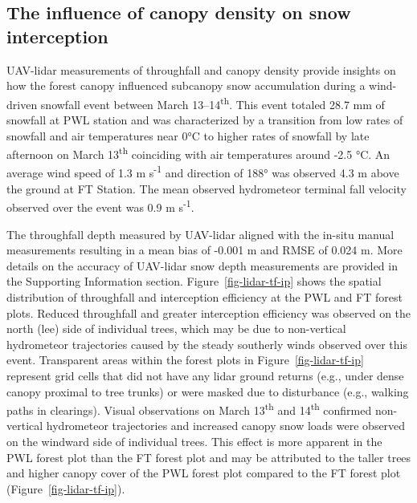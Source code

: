\documentclass[
  letterpaper,
  DIV=11,
  numbers=noendperiod]{scrartcl}
\begin{document}
\subsection{The influence of canopy density on snow
interception}\label{the-influence-of-canopy-density-on-snow-interception}

UAV-lidar measurements of throughfall and canopy density provide
insights on how the forest canopy influenced subcanopy snow accumulation
during a wind-driven snowfall event between March
13--14\textsuperscript{th}. This event totaled 28.7 mm of snowfall at
PWL station and was characterized by a transition from low rates of
snowfall and air temperatures near 0°C to higher rates of snowfall by
late afternoon on March 13\textsuperscript{th} coinciding with air
temperatures around -2.5 °C. An average wind speed of 1.3 m
s\textsuperscript{-1} and direction of 188° was observed 4.3 m above the
ground at FT Station. The mean observed hydrometeor terminal fall
velocity observed over the event was 0.9 m s\textsuperscript{-1}.

The throughfall depth measured by UAV-lidar aligned with the in-situ
manual measurements resulting in a mean bias of -0.001 m and RMSE of
0.024 m. More details on the accuracy of UAV-lidar snow depth
measurements are provided in the Supporting Information section.
Figure~\ref{fig-lidar-tf-ip} shows the spatial distribution of
throughfall and interception efficiency at the PWL and FT forest plots.
Reduced throughfall and greater interception efficiency was observed on
the north (lee) side of individual trees, which may be due to
non-vertical hydrometeor trajectories caused by the steady southerly
winds observed over this event. Transparent areas within the forest
plots in Figure~\ref{fig-lidar-tf-ip} represent grid cells that did not
have any lidar ground returns (e.g., under dense canopy proximal to tree
trunks) or were masked due to disturbance (e.g., walking paths in
clearings). Visual observations on March 13\textsuperscript{th} and
14\textsuperscript{th} confirmed non-vertical hydrometeor trajectories
and increased canopy snow loads were observed on the windward side of
individual trees. This effect is more apparent in the PWL forest plot
than the FT forest plot and may be attributed to the taller trees and
higher canopy cover of the PWL forest plot compared to the FT forest
plot (Figure~\ref{fig-lidar-tf-ip}).
\end{document}

